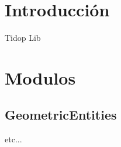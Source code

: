 \hypertarget{index_intro_sec}{}\section{Introducción}\label{index_intro_sec}
Tidop Lib\hypertarget{index_Modulos}{}\section{Modulos}\label{index_Modulos}
\hypertarget{index_Entidades}{}\subsection{Geometric\+Entities}\label{index_Entidades}
etc... 